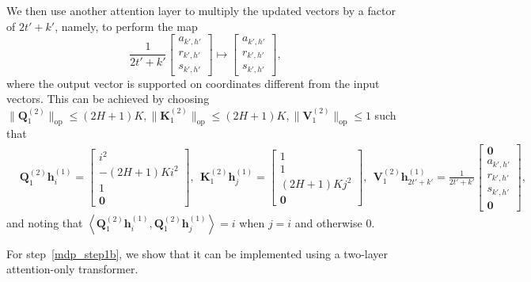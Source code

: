 \documentclass[10pt]{article}
\newcommand{\lops}[1]{\|{#1}\|_{\mathrm{op}}}
\newcommand{\<}{\left\langle}
\renewcommand{\>}{\right\rangle}
\renewcommand{\bQ}{\mathbf{Q}}
\newcommand{\bzero}{{\mathbf 0}}
\newcommand{\state}{{s}}
\newcommand{\action}{{a}}
\newcommand{\reward}{{r}}
\newcommand{\Numepi}{{K}}
\newcommand{\horizon}{{H}}
\renewcommand{\horizon}{{H}}
\def\bK{{\mathbf K}}
\def\bQ{{\mathbf Q}}
\def\bV{{\mathbf V}}
\def\bh{{\mathbf h}}
\begin{document}
We then use another  attention layer to  multiply the updated vectors by a factor of $2t'+k'$, namely, to perform the map
$$\frac{1}{2t'+k'}\begin{bmatrix}
        \action_{k',h'} \\\reward_{k',h'}\\\state_{k',h'}
    \end{bmatrix}\mapsto\begin{bmatrix}
        \action_{k',h'} \\\reward_{k',h'}\\\state_{k',h'}
    \end{bmatrix},$$ where the output vector is supported on coordinates different from the input vectors. This can be achieved by choosing $\lops{\bQ_1^{(2)}}\leq (2\horizon+1)\Numepi, \lops{\bK_1^{(2)}}\leq (2\horizon+1)\Numepi, \lops{\bV_1^{(2)}}\leq1$
such that \begin{align}
    &
\bQ^{(2)}_{1}\bh^{(1)}_{i}=\begin{bmatrix}
         i^2\\-(2\horizon+1)\Numepi i^2\\  1\\ \bzero
    \end{bmatrix},~~ \bK^{(2)}_{1}\bh^{(1)}_{j}=\begin{bmatrix}
        1\\1\\ (2\horizon+1)\Numepi j^2\\\bzero
    \end{bmatrix},~~ 
\bV^{(2)}_{1}\bh^{(1)}_{2t'+k'}=\frac{1}{2t'+k'}\begin{bmatrix}
        \bzero\\ 
        \action_{k',h'} \\\reward_{k',h'}\\\state_{k',h'}
    \\ \bzero
    \end{bmatrix},\label{eq:tf_constrcut_ucbvi_multi}
\end{align}
and noting that $\<\bQ^{(2)}_1\bh_i^{(1)},\bQ^{(2)}_1\bh_j^{(1)}\>=i$ when $j=i$ and otherwise $0$.

For step~\ref{mdp_step1b},  we show that it can be implemented using a two-layer attention-only transformer. 
\end{document}
